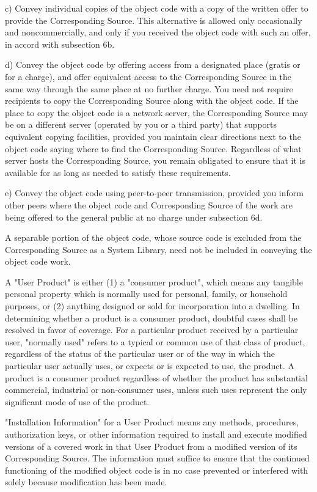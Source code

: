 \documentclass[parskip=half]{scrartcl}
\begin{document}
    c) Convey individual copies of the object code with a copy of the
    written offer to provide the Corresponding Source.  This
    alternative is allowed only occasionally and noncommercially, and
    only if you received the object code with such an offer, in accord
    with subsection 6b.

    d) Convey the object code by offering access from a designated
    place (gratis or for a charge), and offer equivalent access to the
    Corresponding Source in the same way through the same place at no
    further charge.  You need not require recipients to copy the
    Corresponding Source along with the object code.  If the place to
    copy the object code is a network server, the Corresponding Source
    may be on a different server (operated by you or a third party)
    that supports equivalent copying facilities, provided you maintain
    clear directions next to the object code saying where to find the
    Corresponding Source.  Regardless of what server hosts the
    Corresponding Source, you remain obligated to ensure that it is
    available for as long as needed to satisfy these requirements.

    e) Convey the object code using peer-to-peer transmission, provided
    you inform other peers where the object code and Corresponding
    Source of the work are being offered to the general public at no
    charge under subsection 6d.

  A separable portion of the object code, whose source code is excluded
from the Corresponding Source as a System Library, need not be
included in conveying the object code work.

  A "User Product" is either (1) a "consumer product", which means any
tangible personal property which is normally used for personal, family,
or household purposes, or (2) anything designed or sold for incorporation
into a dwelling.  In determining whether a product is a consumer product,
doubtful cases shall be resolved in favor of coverage.  For a particular
product received by a particular user, "normally used" refers to a
typical or common use of that class of product, regardless of the status
of the particular user or of the way in which the particular user
actually uses, or expects or is expected to use, the product.  A product
is a consumer product regardless of whether the product has substantial
commercial, industrial or non-consumer uses, unless such uses represent
the only significant mode of use of the product.

  "Installation Information" for a User Product means any methods,
procedures, authorization keys, or other information required to install
and execute modified versions of a covered work in that User Product from
a modified version of its Corresponding Source.  The information must
suffice to ensure that the continued functioning of the modified object
code is in no case prevented or interfered with solely because
modification has been made.
\end{document}
